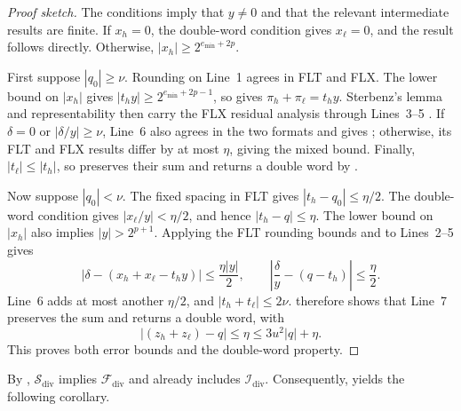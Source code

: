 \begin{proof}[Proof sketch]
The conditions imply that $y\neq0$ and that the relevant intermediate results
are finite. If $x_h=0$, the double-word condition gives $x_\ell=0$, and the
result follows directly. Otherwise,
$|x_h|\geq2^{e_{\min}+2p}$.

First suppose $|q_0|\geq\nu$. Rounding on Line~1 agrees in FLT
and FLX. The lower bound on
$|x_h|$ gives $|t_hy|\geq2^{e_{\min}+2p-1}$, so
 gives $\pi_h+\pi_\ell=t_hy$. Sterbenz's lemma and
representability then carry the FLX residual analysis through Lines~3--5
\citep{Sterbenz1974}. If $\delta=0$ or $|\delta/y|\geq\nu$, Line~6 also agrees
in the two formats and gives ; otherwise, its FLT
and FLX results differ by at most $\eta$, giving the mixed bound. Finally,
$|t_\ell|\leq|t_h|$, so \FastTwoSum{} preserves their sum and returns a double
word by .

Now suppose $|q_0|<\nu$. The fixed spacing in FLT gives
$|t_h-q_0|\leq\eta/2$. The double-word
condition gives $|x_\ell/y|<\eta/2$, and hence $|t_h-q|\leq\eta$. The lower
bound on $|x_h|$ also implies $|y|>2^{p+1}$. Applying the FLT rounding bounds
and  to Lines~2--5 gives
\begin{equation}
  |\delta-(x_h+x_\ell-t_hy)|
    \leq\frac{\eta|y|}{2},
  \qquad
  \left|\frac{\delta}{y}-(q-t_h)\right|\leq\frac{\eta}{2}.
  \label{eq:dw-div-subnormal-residual}
\end{equation}
Line~6 adds at most another $\eta/2$, and $|t_h+t_\ell|\leq2\nu$.
 therefore shows that Line~7 preserves the sum
and returns a double word, with
\[
  |(z_h+z_\ell)-q|
    \leq\eta
    \leq3u^2|q|+\eta.
\]
This proves both error bounds and the double-word property.
\end{proof}

By ,
$\mathcal{S}_{\mathrm{div}}$ implies $\mathcal{F}_{\mathrm{div}}$ and already
includes $\mathcal{I}_{\mathrm{div}}$. Consequently,
 yields the following corollary.


